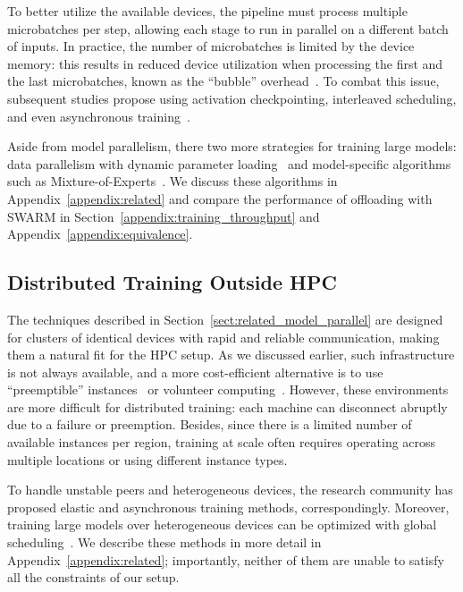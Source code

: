 To better utilize the available devices, the pipeline must process multiple microbatches per step, allowing each stage to run in parallel on a different batch of inputs. In practice, the number of microbatches is limited by the device memory: this results in reduced device utilization when processing the first and the last microbatches, known as the ``bubble'' overhead~\citep{huang2019gpipe}. To combat this issue, subsequent studies propose using activation checkpointing, interleaved scheduling, and even asynchronous training~\citep{pipedream,megatron2,huang2019gpipe,shoeybi2019megatron,pipemare}.

Aside from model parallelism, there two more strategies for training large models: data parallelism with dynamic parameter loading~\citep{zero} and model-specific algorithms such as Mixture-of-Experts~\citep{shazeer2017outrageously}. We discuss these algorithms in Appendix~\ref{appendix:related} and compare the performance of offloading with SWARM in Section~\ref{appendix:training_throughput} and Appendix~\ref{appendix:equivalence}.

\vspace{-6pt}
\subsection{Distributed Training Outside HPC}
\label{sect:related_cost_efficent_collaborative}
\vspace{-2pt}

The techniques described in Section~\ref{sect:related_model_parallel} are designed for clusters of identical devices with rapid and reliable communication, making them a natural fit for the HPC setup. As we discussed earlier, such infrastructure is not always available, and a more cost-efficient alternative is to use ``preemptible'' instances~\citep{li2019speeding,zhang2020machine,proteus} or volunteer computing~\citep{volunteer_dl_async,hivemind_dmoe,eydle,dedloc}. However, these environments are more difficult for distributed training: each machine can disconnect abruptly due to a failure or preemption. Besides, since there is a limited number of available instances per region, training at scale often requires operating across multiple locations or using different instance types.

To handle unstable peers and heterogeneous devices, the research community has proposed elastic and asynchronous training methods, correspondingly.
Moreover, training large models over heterogeneous devices can be optimized with global scheduling~\cite{yuan2022decentralized}.
We describe these methods in more detail in Appendix~\ref{appendix:related}; importantly, neither of them are unable to satisfy all the constraints of our setup.

